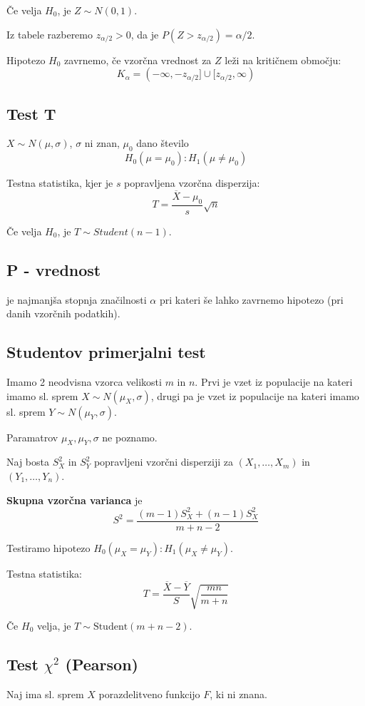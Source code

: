 \begin{multicols}{5}
Če velja $H_0$, je $Z \sim N(0,1)$.

Iz tabele razberemo $z_{\alpha/2} > 0$, da je $P(Z > z_{\alpha/2}) = \alpha/2$.

Hipotezo $H_0$ zavrnemo, če vzorčna vrednost za $Z$ leži na kritičnem območju:
\[ K_\alpha = (-\infty, -z_{\alpha/2}] \cup [z_{\alpha/2}, \infty)\]

\subsection{Test T}
$X \sim N(\mu, \sigma)$, $\sigma$ ni znan, $\mu_0$ dano število
\[ H_0(\mu = \mu_0) : H_1(\mu \neq \mu_0)\]

Testna statistika, kjer je $s$ popravljena vzorčna disperzija:
\[ T = \frac{\overline{X} - \mu_0}{s} \sqrt{n}\]

Če velja $H_0$, je $T \sim Student(n-1)$.

\subsection{P - vrednost}
je najmanjša stopnja značilnosti $\alpha$ pri kateri še lahko zavrnemo hipotezo (pri danih vzorčnih podatkih).

\subsection{Studentov primerjalni test}
Imamo 2 neodvisna vzorca velikosti $m$ in $n$. Prvi je vzet iz populacije na kateri imamo sl. sprem $X \sim N(\mu_X, \sigma)$, drugi pa je 
vzet iz populacije na kateri imamo sl. sprem $Y \sim N(\mu_Y, \sigma)$. 

Paramatrov $\mu_X, \mu_Y, \sigma$ ne poznamo.

Naj bosta $S_X^2$ in $S_Y^2$ popravljeni vzorčni disperziji za $(X_1, \dots, X_m)$ in $(Y_1, \dots, Y_n)$.

\textbf{Skupna vzorčna varianca} je
\[ S^2 = \frac{(m-1)S_X^2 + (n-1)S_X^2}{m+n-2}\]

Testiramo hipotezo $H_0(\mu_X = \mu_Y) : H_1(\mu_X \neq \mu_Y)$.

Testna statistika:
\[ T = \frac{\overline{X} - \overline{Y}}{S}\sqrt{\frac{mn}{m+n}}\]

Če $H_0$ velja, je $T \sim \text{Student}(m+n-2)$.

\subsection{Test $\chi^2$ (Pearson)}
Naj ima sl. sprem $X$ porazdelitveno funkcijo $F$, ki ni znana.


\end{multicols}
